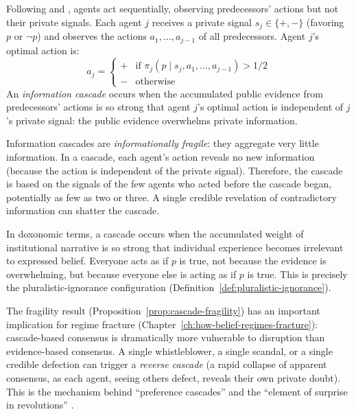 \begin{model}
\label{mod:cascade-threshold}
Following \textcite{banerjee1992} and \textcite{bikhchandani1992}, agents act sequentially, observing predecessors' actions but not their private signals.
Each agent $j$ receives a private signal $s_j \in \{+, -\}$ (favoring $p$ or $\neg p$) and observes the actions $a_1, \ldots, a_{j-1}$ of all predecessors.
Agent $j$'s optimal action is:
\[
  a_j = \begin{cases} + & \text{if } \pi_j(p \mid s_j, a_1, \ldots, a_{j-1}) > 1/2 \\ - & \text{otherwise} \end{cases}
\]
An \emph{information cascade} occurs when the accumulated public evidence from predecessors' actions is so strong that agent $j$'s optimal action is independent of $j$'s private signal: the public evidence overwhelms private information.
\end{model}

\begin{proposition}
\label{prop:cascade-fragility}
Information cascades are \emph{informationally fragile}: they aggregate very little information.
In a cascade, each agent's action reveals no new information (because the action is independent of the private signal).
Therefore, the cascade is based on the signals of the few agents who acted before the cascade began, potentially as few as two or three.
A single credible revelation of contradictory information can shatter the cascade.
\end{proposition}

\begin{remark}
In doxonomic terms, a cascade occurs when the accumulated weight of institutional narrative is so strong that individual experience becomes irrelevant to expressed belief.
Everyone acts as if $p$ is true, not because the evidence is overwhelming, but because everyone else is acting as if $p$ is true.
This is precisely the pluralistic-ignorance configuration (Definition~\ref{def:pluralistic-ignorance}).

The fragility result (Proposition~\ref{prop:cascade-fragility}) has an important implication for regime fracture (Chapter~\ref{ch:how-belief-regimes-fracture}): cascade-based consensus is dramatically more vulnerable to disruption than evidence-based consensus.
A single whistleblower, a single scandal, or a single credible defection can trigger a \emph{reverse cascade} (a rapid collapse of apparent consensus, as each agent, seeing others defect, reveals their own private doubt).
This is the mechanism behind ``preference cascades'' and the ``element of surprise in revolutions'' \autocite{kuran1995}.
\end{remark}


